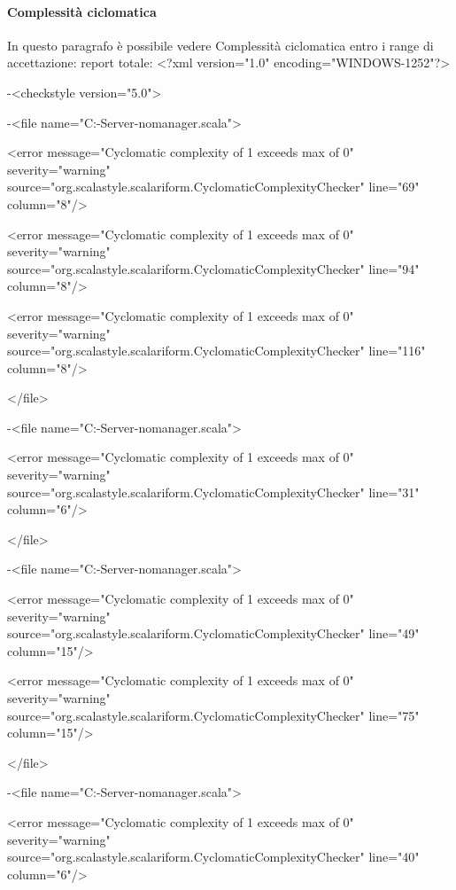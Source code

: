 \documentclass{scalatekids-article}
\begin{document}
\paragraph{Complessità ciclomatica}
In questo paragrafo è possibile vedere %
Complessità ciclomatica entro i range di accettazione: report totale:
<?xml version="1.0" encoding="WINDOWS-1252"?>

-<checkstyle version="5.0">


-<file name="C:\Users\Davide\Desktop\Actorbase-Server-nomanager\src\main\scala\com\actorbase\actorsystem\clientactor\UserApi.scala">

<error message="Cyclomatic complexity of 1 exceeds max of 0" severity="warning" source="org.scalastyle.scalariform.CyclomaticComplexityChecker" line="69" column="8"/>

<error message="Cyclomatic complexity of 1 exceeds max of 0" severity="warning" source="org.scalastyle.scalariform.CyclomaticComplexityChecker" line="94" column="8"/>

<error message="Cyclomatic complexity of 1 exceeds max of 0" severity="warning" source="org.scalastyle.scalariform.CyclomaticComplexityChecker" line="116" column="8"/>

</file>


-<file name="C:\Users\Davide\Desktop\Actorbase-Server-nomanager\src\main\scala\com\actorbase\actorsystem\clientactor\CollectionApi.scala">

<error message="Cyclomatic complexity of 1 exceeds max of 0" severity="warning" source="org.scalastyle.scalariform.CyclomaticComplexityChecker" line="31" column="6"/>

</file>


-<file name="C:\Users\Davide\Desktop\Actorbase-Server-nomanager\src\main\scala\com\actorbase\actorsystem\httpserver\SSLConfiguration.scala">

<error message="Cyclomatic complexity of 1 exceeds max of 0" severity="warning" source="org.scalastyle.scalariform.CyclomaticComplexityChecker" line="49" column="15"/>

<error message="Cyclomatic complexity of 1 exceeds max of 0" severity="warning" source="org.scalastyle.scalariform.CyclomaticComplexityChecker" line="75" column="15"/>

</file>


-<file name="C:\Users\Davide\Desktop\Actorbase-Server-nomanager\src\main\scala\com\actorbase\actorsystem\userfinder\Userfinder.scala">

<error message="Cyclomatic complexity of 1 exceeds max of 0" severity="warning" source="org.scalastyle.scalariform.CyclomaticComplexityChecker" line="40" column="6"/>
\end{document}
